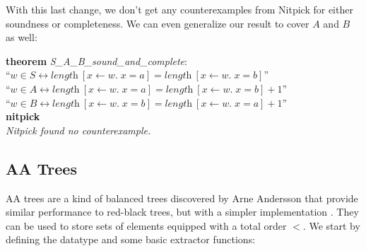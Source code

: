 \documentclass[a4paper,12pt]{article}
\begin{document}
With this last change, we don't get any counterexamples from Nitpick for either
soundness or completeness. We can even generalize our result to cover $A$ and
$B$ as well:

\prew
\textbf{theorem} \textit{S\_A\_B\_sound\_and\_complete}: \\
``$w \in S \longleftrightarrow \textit{length}~[x \mathbin{\leftarrow} w.\; x = a] = \textit{length}~[x \mathbin{\leftarrow} w.\; x = b]$'' \\
``$w \in A \longleftrightarrow \textit{length}~[x \mathbin{\leftarrow} w.\; x = a] = \textit{length}~[x \mathbin{\leftarrow} w.\; x = b] + 1$'' \\
``$w \in B \longleftrightarrow \textit{length}~[x \mathbin{\leftarrow} w.\; x = b] = \textit{length}~[x \mathbin{\leftarrow} w.\; x = a] + 1$'' \\
\textbf{nitpick} \\[2\smallskipamount]
\slshape Nitpick found no counterexample.
\postw

\subsection{AA Trees}
\label{aa-trees}

AA trees are a kind of balanced trees discovered by Arne Andersson that provide
similar performance to red-black trees, but with a simpler implementation
\cite{andersson-1993}. They can be used to store sets of elements equipped with
a total order $<$. We start by defining the datatype and some basic extractor
functions:
\end{document}
